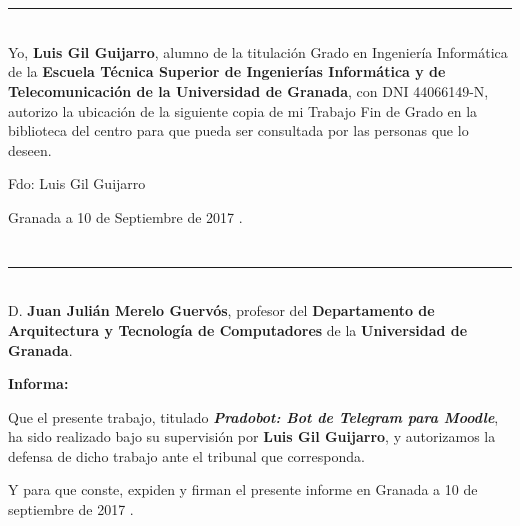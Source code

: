 \chapter*{}
\thispagestyle{empty}

\noindent\rule[-1ex]{\textwidth}{2pt}\\[4.5ex]

Yo, \textbf{Luis Gil Guijarro}, alumno de la titulación Grado en Ingeniería Informática de la \textbf{Escuela Técnica Superior
de Ingenierías Informática y de Telecomunicación de la Universidad de Granada}, con DNI 44066149-N, autorizo la
ubicación de la siguiente copia de mi Trabajo Fin de Grado en la biblioteca del centro para que pueda ser
consultada por las personas que lo deseen.

\vspace{6cm}

\noindent Fdo: Luis Gil Guijarro

\vspace{2cm}

\begin{flushright}
Granada a 10 de Septiembre de 2017 .
\end{flushright}


\chapter*{}
\thispagestyle{empty}

\noindent\rule[-1ex]{\textwidth}{2pt}\\[4.5ex]

D. \textbf{Juan Julián Merelo Guervós}, profesor del \textbf{Departamento de Arquitectura y Tecnología de Computadores} de la \textbf{Universidad de Granada}.


\vspace{0.5cm}

\textbf{Informa:}

\vspace{0.5cm}

Que el presente trabajo, titulado \textit{\textbf{Pradobot: Bot de Telegram para Moodle}},
ha sido realizado bajo su supervisión por \textbf{Luis Gil Guijarro}, y autorizamos la defensa de dicho trabajo ante el tribunal
que corresponda.

\vspace{0.5cm}

Y para que conste, expiden y firman el presente informe en Granada a 10 de septiembre de 2017 .

\vspace{1cm}

